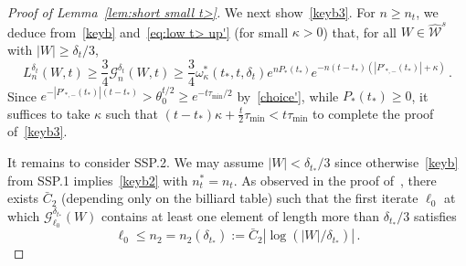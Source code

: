 \documentclass[AHL,Unicode,longabstracts,published]{cedram}
\newcommand{\cG}{\mathcal{G}}
\newcommand{\cW}{\mathcal{W}}
\newcommand{\hW}{\widehat{\cW}}
\begin{document}
\begin{proof}[Proof of Lemma~\ref{lem:short small t>}]
We next show~\eqref{keyb3}. For $n\ge n_t$, we deduce from~\eqref{keyb} and~\eqref{eq:low t> up'} (for small $\kappa>0$) that, for all $W\in \hW^s$ with $|W|\ge \delta_t /3$,
\begin{equation}\label{choicekappa}
L_n^{\delta_t}(W,t) \ge \frac {3}{4} \cG_n^{\delta_t}(W,t)\ge \frac {3}{4}\omega_\kappa^*(t_*,t,\delta_t) e^{nP_*(t_*)} e^{-n (t-t_*)\left(\left|P'_{*,-}(t_*)\right|+\kappa\right)}\,.
\end{equation}
Since $ e^{-| P'_{*,-}(t_*)| (t-t_*)} > \theta_0^{t/2}\ge e^{-t\tau_{\min}/2}$ by~\eqref{choice'}, while $P_*(t_*)\ge 0$, it suffices to take $\kappa$ such that $ (t-t_*)\kappa +\frac{t}{2}\tau_{\min} < t \tau_{\min} $ to complete the proof of~\eqref{keyb3}.


It remains to consider SSP.2. We may assume $|W|<\delta_{t_*}/3$ since otherwise~\eqref{keyb} from SSP.1 implies~\eqref{keyb2} with $n_{t}^*=n_t$. As observed in the proof of~\cite[Cor.~5.3]{BD1}, there exists $\bar C_2$ (depending only on the billiard table) such that the first iterate $\ell_0$ at which $\cG^{\delta_{t_*}}_{\ell_0}(W)$ contains at least one element of length more than $\delta_{t_*}/3$ satisfies
\[
\ell_0 \le n_2=n_2(\delta_{t_*}) := \bar C_2 \left|\log\left(|W|/\delta_{t_*}\right)\right|\,.
\]


\end{proof}
\end{document}
